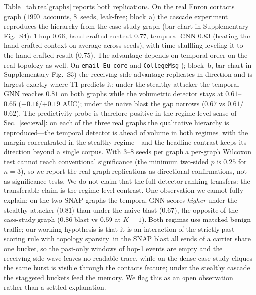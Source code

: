 Table~\ref{tab:realgraphs} reports both replications. On the real Enron contacts graph ($1990$~accounts,
$8$~seeds, leak-free; block~a) the cascade experiment reproduces the hierarchy from the case-study graph
(bar chart in Supplementary Fig.~S4): 1-hop $0.66$, hand-crafted context $0.77$, temporal GNN $0.83$ (beating
the hand-crafted context on average across seeds), with time shuffling leveling it to the hand-crafted result
($0.75$). The advantage depends on temporal order on the real topology as well. On \texttt{email-Eu-core}
\citep{paranjape2017motifs} and \texttt{CollegeMsg} \citep{panzarasa2009patterns} (\citep{leskovec2014snap};
block~b, bar chart in Supplementary Fig.~S3) the receiving-side advantage replicates in direction and is
largest exactly where T1 predicts it: under the stealthy attacker the temporal GNN reaches $0.81$ on both
graphs while the volumetric detector stays at $0.61$--$0.65$ ($+0.16$/$+0.19$ AUC); under the naive blast the
gap narrows ($0.67$ vs $0.61$/$0.62$). The predictivity probe is therefore positive in the regime-level sense of
Sec.~\ref{sec:eval}: on each of the three real graphs the qualitative hierarchy is reproduced---the temporal
detector is ahead of volume in both regimes, with the margin concentrated in the stealthy regime---and the
headline contrast keeps its direction beyond a single corpus. With $3$--$8$ seeds per
graph a per-graph Wilcoxon test cannot reach conventional significance (the minimum two-sided $p$ is $0.25$
for $n{=}3$), so we report the real-graph replications as directional confirmations, not as significance
tests. We do not claim that the full detector ranking transfers; the transferable claim is the regime-level
contrast. One observation we cannot fully explain: on the two SNAP graphs the temporal GNN scores
\emph{higher} under the stealthy attacker ($0.81$) than under the naive blast ($0.67$), the opposite of the
case-study graph ($0.86$ blast vs $0.59$ at $K{=}1$). Both regimes use matched benign traffic; our working
hypothesis is that it is an interaction of the strictly-past scoring rule with topology sparsity: in the
SNAP blast all sends of a carrier share one bucket, so the past-only windows of hop-1 events are empty and
the receiving-side wave leaves no readable trace, while on the dense case-study cliques the same burst is
visible through the contacts feature; under the stealthy cascade the staggered buckets feed the memory. We
flag this as an open observation rather than a settled explanation.

